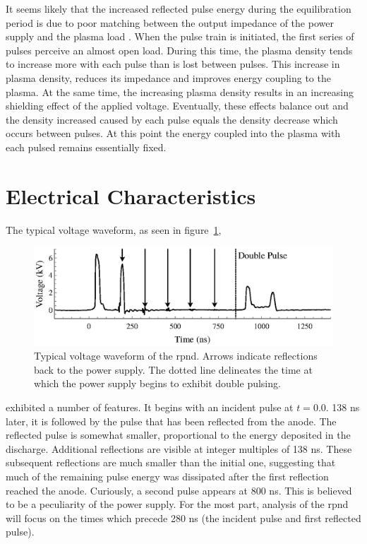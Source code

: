 It seems likely that the increased reflected pulse energy during the
equilibration period is due to poor matching between the output impedance of the
power supply and the plasma load \cite{Pancheshnyi2006}. When the pulse train is
initiated, the first series of pulses perceive an almost open load. During this
time, the plasma density tends to increase more with each pulse than is lost
between pulses. This increase in plasma density, reduces its impedance and
improves energy coupling to the plasma. At the same time, the increasing plasma
density results in an increasing shielding effect of the applied voltage.
Eventually, these effects balance out and the density increased caused by each
pulse equals the density decrease which occurs between pulses. At this point the
energy coupled into the plasma with each pulsed remains essentially fixed.

\section{Electrical Characteristics}

The typical voltage waveform, as seen in figure~\ref{fig:waveform},
\begin{figure}
  \centering
  \includegraphics{./chapters/experiment/figures/waveform.eps}
  \caption{Typical voltage waveform of the \acs{rpnd}. Arrows indicate
    reflections back to the power supply. The dotted line delineates the time at
    which the power supply begins to exhibit double pulsing.}
  \label{fig:waveform}
\end{figure}
exhibited a number of features. It begins with an incident pulse at $t = 0.0$.
138 ns later, it is followed by the pulse that has been reflected from the
anode. The reflected pulse is somewhat smaller, proportional to the energy
deposited in the discharge. Additional reflections are visible at integer
multiples of 138 ns. These subsequent reflections are much smaller than the
initial one, suggesting that much of the remaining pulse energy was dissipated
after the first reflection reached the anode. Curiously, a second pulse appears
at 800 ns. This is believed to be a peculiarity of the power supply. For the
most part, analysis of the \acs{rpnd} will focus on the times which precede 280
ns (the incident pulse and first reflected pulse).

